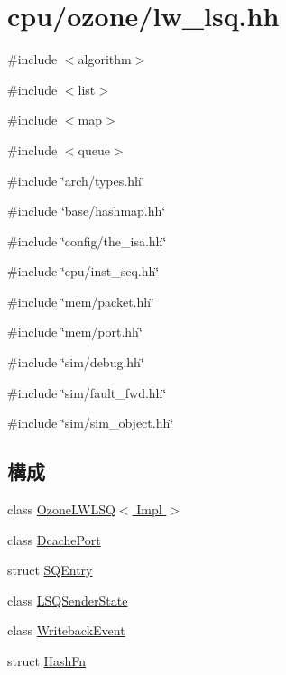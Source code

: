 \hypertarget{lw__lsq_8hh}{
\section{cpu/ozone/lw\_\-lsq.hh}
\label{lw__lsq_8hh}
}
{\ttfamily \#include $<$algorithm$>$}\par
{\ttfamily \#include $<$list$>$}\par
{\ttfamily \#include $<$map$>$}\par
{\ttfamily \#include $<$queue$>$}\par
{\ttfamily \#include \char`\"{}arch/types.hh\char`\"{}}\par
{\ttfamily \#include \char`\"{}base/hashmap.hh\char`\"{}}\par
{\ttfamily \#include \char`\"{}config/the\_\-isa.hh\char`\"{}}\par
{\ttfamily \#include \char`\"{}cpu/inst\_\-seq.hh\char`\"{}}\par
{\ttfamily \#include \char`\"{}mem/packet.hh\char`\"{}}\par
{\ttfamily \#include \char`\"{}mem/port.hh\char`\"{}}\par
{\ttfamily \#include \char`\"{}sim/debug.hh\char`\"{}}\par
{\ttfamily \#include \char`\"{}sim/fault\_\-fwd.hh\char`\"{}}\par
{\ttfamily \#include \char`\"{}sim/sim\_\-object.hh\char`\"{}}\par
\subsection*{構成}
\begin{DoxyCompactItemize}
\item 
class \hyperlink{classOzoneLWLSQ}{OzoneLWLSQ$<$ Impl $>$}
\item 
class \hyperlink{classOzoneLWLSQ_1_1DcachePort}{DcachePort}
\item 
struct \hyperlink{structOzoneLWLSQ_1_1SQEntry}{SQEntry}
\item 
class \hyperlink{classOzoneLWLSQ_1_1LSQSenderState}{LSQSenderState}
\item 
class \hyperlink{classOzoneLWLSQ_1_1WritebackEvent}{WritebackEvent}
\item 
struct \hyperlink{structOzoneLWLSQ_1_1HashFn}{HashFn}
\end{DoxyCompactItemize}
